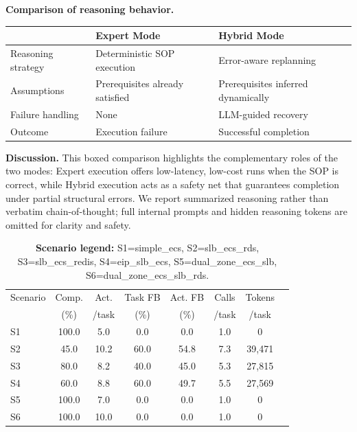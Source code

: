 \documentclass{article}
\theoremstyle{plain}
\theoremstyle{definition}
\theoremstyle{remark}
\begin{document}
\begin{tcolorbox}[title=\large\bfseries  Expert vs.\ Hybrid Reasoning Traces]
\medskip
\noindent\textbf{Comparison of reasoning behavior.}

\begin{center}
\small
\begin{tabular}{p{3.6cm} p{4.2cm} p{4.2cm}}
\toprule
 & \textbf{Expert Mode} & \textbf{Hybrid Mode} \\
\midrule
Reasoning strategy & Deterministic SOP execution & Error-aware replanning \\
Assumptions & Prerequisites already satisfied & Prerequisites inferred dynamically \\
Failure handling & None & LLM-guided recovery \\
Outcome & Execution failure & Successful completion \\
\bottomrule
\end{tabular}
\end{center}

\medskip
\noindent\textbf{Discussion.}
This boxed comparison highlights the complementary roles of the two modes:
Expert execution offers low-latency, low-cost runs when the SOP is correct, while Hybrid execution
acts as a safety net that guarantees completion under partial structural errors.
We report summarized reasoning rather than verbatim chain-of-thought; full internal prompts and hidden reasoning tokens are omitted for clarity and safety.
\end{tcolorbox}



\begin{table}[t]
\centering
\caption{{\textbf{Scenario legend:}
S1=simple\_ecs,
S2=slb\_ecs\_rds,
S3=slb\_ecs\_redis,
S4=eip\_slb\_ecs,
S5=dual\_zone\_ecs\_slb,
S6=dual\_zone\_ecs\_slb\_rds.}}
\label{tab:scenario_metrics}
\small
\setlength{\tabcolsep}{4pt}
\renewcommand{\arraystretch}{1.05}
\begin{tabular}{@{}lccccccc@{}}
\toprule
Scenario & Comp. & Act. & Task FB & Act. FB & Calls & Tokens \\
        & (\%)  & /task & (\%)    & (\%)    & /task & /task \\
\midrule
S1 & 100.0 & 5.0  & 0.0  & 0.0  & 1.0 & 0 \\
S2 & 45.0  & 10.2 & 60.0 & 54.8 & 7.3 & 39{,}471 \\
S3 & 80.0  & 8.2  & 40.0 & 45.0 & 5.3 & 27{,}815 \\
S4 & 60.0  & 8.8  & 60.0 & 49.7 & 5.5 & 27{,}569 \\
S5 & 100.0 & 7.0  & 0.0  & 0.0  & 1.0 & 0 \\
S6 & 100.0 & 10.0 & 0.0  & 0.0  & 1.0 & 0 \\
\bottomrule
\end{tabular}
\end{table}
\end{document}
